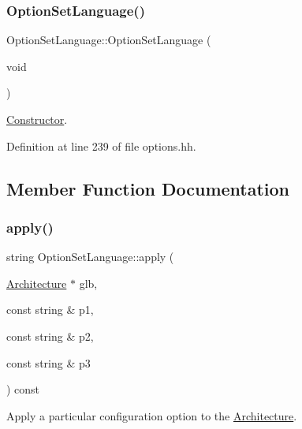 \subsubsection{\texorpdfstring{OptionSetLanguage()}{OptionSetLanguage()}}
{\footnotesize\ttfamily Option\+Set\+Language\+::\+Option\+Set\+Language (\begin{DoxyParamCaption}\item[{void}]{ }\end{DoxyParamCaption})\hspace{0.3cm}{\ttfamily [inline]}}



\mbox{\hyperlink{class_constructor}{Constructor}}. 



Definition at line 239 of file options.\+hh.



\subsection{Member Function Documentation}
\mbox{\label{class_option_set_language_add4e5b7ef4cc478556814a4b232969fc}} 
\subsubsection{\texorpdfstring{apply()}{apply()}}
{\footnotesize\ttfamily string Option\+Set\+Language\+::apply (\begin{DoxyParamCaption}\item[{\mbox{\hyperlink{class_architecture}{Architecture}} $\ast$}]{glb,  }\item[{const string \&}]{p1,  }\item[{const string \&}]{p2,  }\item[{const string \&}]{p3 }\end{DoxyParamCaption}) const\hspace{0.3cm}{\ttfamily [virtual]}}



Apply a particular configuration option to the \mbox{\hyperlink{class_architecture}{Architecture}}. 

